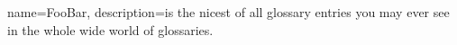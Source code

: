 {
  name=FooBar,
  description={is the nicest of all glossary entries you may ever see in the whole wide world of glossaries.}
}
